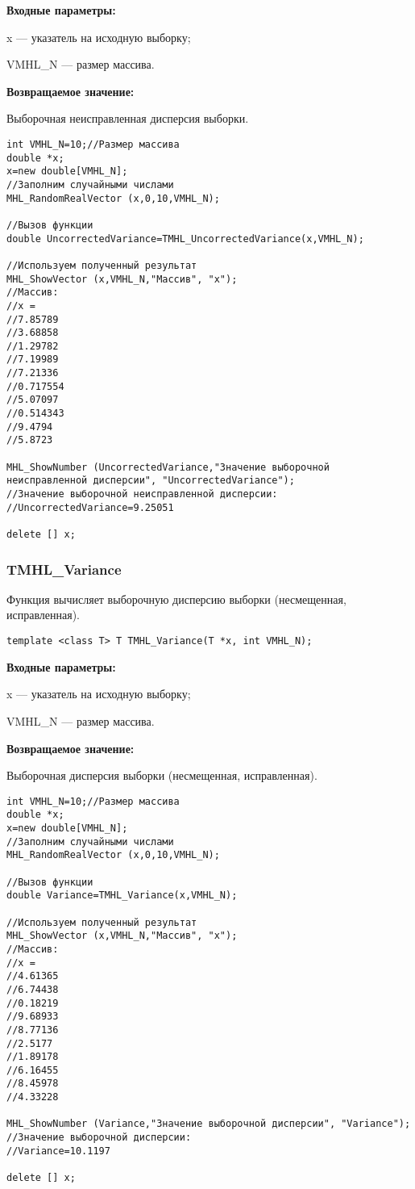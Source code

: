 \documentclass[a4paper,12pt]{article}
\begin{document}
\textbf{Входные параметры:}
 
x --- указатель на исходную выборку;
 
VMHL\_N --- размер массива.

\textbf{Возвращаемое значение:}
 
Выборочная неисправленная дисперсия выборки.


\begin{lstlisting}[label=code_use_TMHL_UncorrectedVariance,caption=Пример использования]
int VMHL_N=10;//Размер массива
double *x;
x=new double[VMHL_N];
//Заполним случайными числами
MHL_RandomRealVector (x,0,10,VMHL_N);

//Вызов функции
double UncorrectedVariance=TMHL_UncorrectedVariance(x,VMHL_N);

//Используем полученный результат
MHL_ShowVector (x,VMHL_N,"Массив", "x");
//Массив:
//x =
//7.85789
//3.68858
//1.29782
//7.19989
//7.21336
//0.717554
//5.07097
//0.514343
//9.4794
//5.8723

MHL_ShowNumber (UncorrectedVariance,"Значение выборочной неисправленной дисперсии", "UncorrectedVariance");
//Значение выборочной неисправленной дисперсии:
//UncorrectedVariance=9.25051

delete [] x;
\end{lstlisting}

\subsubsection{TMHL\_Variance}\label{TMHL_Variance}

Функция вычисляет выборочную дисперсию выборки (несмещенная, исправленная).


\begin{lstlisting}[label=code_syntax_TMHL_Variance,caption=Синтаксис]
template <class T> T TMHL_Variance(T *x, int VMHL_N);
\end{lstlisting}

\textbf{Входные параметры:}
 
x --- указатель на исходную выборку;
 
VMHL\_N --- размер массива.

\textbf{Возвращаемое значение:}
 
Выборочная дисперсия выборки (несмещенная, исправленная).


\begin{lstlisting}[label=code_use_TMHL_Variance,caption=Пример использования]
int VMHL_N=10;//Размер массива
double *x;
x=new double[VMHL_N];
//Заполним случайными числами
MHL_RandomRealVector (x,0,10,VMHL_N);

//Вызов функции
double Variance=TMHL_Variance(x,VMHL_N);

//Используем полученный результат
MHL_ShowVector (x,VMHL_N,"Массив", "x");
//Массив:
//x =
//4.61365
//6.74438
//0.18219
//9.68933
//8.77136
//2.5177
//1.89178
//6.16455
//8.45978
//4.33228

MHL_ShowNumber (Variance,"Значение выборочной дисперсии", "Variance");
//Значение выборочной дисперсии:
//Variance=10.1197

delete [] x;
\end{lstlisting}
\end{document}
